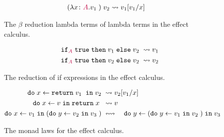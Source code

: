 \documentclass{Report}
\begin{document}
\begin{figure}
    \begin{framed}
        \begin{align*}
            \apply{(\lam{x}{A}{v_1})}{v_2} & \rightsquigarrow v_1\ssub{x}{v_1}
        \end{align*}
    \end{framed}
    \caption{The $\beta$ reduction lambda terms of lambda terms in the effect calculus.}
    \label{ECBeta}
\end{figure}

\begin{figure}
    \begin{framed}
        \begin{align*}
            \pifthenelse{A}{\t}{v_1}{v_2} & \rightsquigarrow v_1\\
            \pifthenelse{A}{\t}{v_2}{v_2} & \rightsquigarrow v_2\\
        \end{align*}
    \end{framed}
    \caption{The reduction of if expressions in the effect calculus.}
    \label{ECIf}
\end{figure}


\begin{figure}
    \begin{framed}
        \begin{align*}
            \doin{x}{\return{v_1}}{v_2} & \rightsquigarrow v_2\ssub{x}{v_1}\\
            \doin{x}{v}{\return{x}} & \rightsquigarrow v\\
            \doin{x}{v_1}{(\doin{y}{v_2}{v_3})} 
            & \leftrightsquigarrow\quad  \doin{y}{(\doin{y}{v_1}{v_2})}{v_3}
        \end{align*}
    \end{framed}
    \caption{The monad laws for the effect calculus.}
    \label{ECMonads}
\end{figure}
\end{document}
